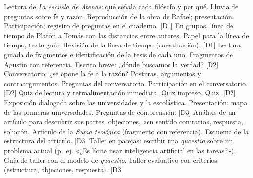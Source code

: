 \documentclass[parcelacion]{planeacion}
\begin{document}
\begin{parcelacion}
    {Lectura de \emph{La escuela de Atenas}: qué señala cada filósofo y por qué. Lluvia de
     preguntas sobre fe y razón.}
    {Reproducción de la obra de Rafael; presentación.}
    {Participación; registro de preguntas en el cuaderno. {\scriptsize[D1]}}
    {En grupos, línea de tiempo de Platón a Tomás con las distancias entre autores.}
    {Papel para la línea de tiempo; texto guía.}
    {Revisión de la línea de tiempo (coevaluación). {\scriptsize[D1]}}
    {Lectura guiada de fragmentos e identificación de la tesis de cada uno.}
    {Fragmentos de Agustín con referencia.}
    {Escrito breve: ¿dónde buscamos la verdad? {\scriptsize[D2]}}
    {Conversatorio: ¿se opone la fe a la razón? Posturas, argumentos y contraargumentos.}
    {Preguntas del conversatorio.}
    {Participación en el conversatorio. {\scriptsize[D2]}}
    {Quiz de lectura y retroalimentación inmediata.}
    {Quiz impreso.}
    {Quiz. {\scriptsize[D2]}}
    {Exposición dialogada sobre las universidades y la escolástica.}
    {Presentación; mapa de las primeras universidades.}
    {Preguntas de comprensión. {\scriptsize[D3]}}
    {Análisis de un artículo para descubrir sus partes: objeciones, «en sentido contrario»,
     respuesta, solución.}
    {Artículo de la \emph{Suma teológica} (fragmento con referencia).}
    {Esquema de la estructura del artículo. {\scriptsize[D3]}}
    {Taller en parejas: escribir una \emph{quaestio} sobre un problema actual (p.~ej. «¿Es lícito
     usar inteligencia artificial en las tareas?»).}
    {Guía de taller con el modelo de \emph{quaestio}.}
    {Taller evaluativo con criterios (estructura, objeciones, respuesta). {\scriptsize[D3]}}

\end{parcelacion}
\end{document}
